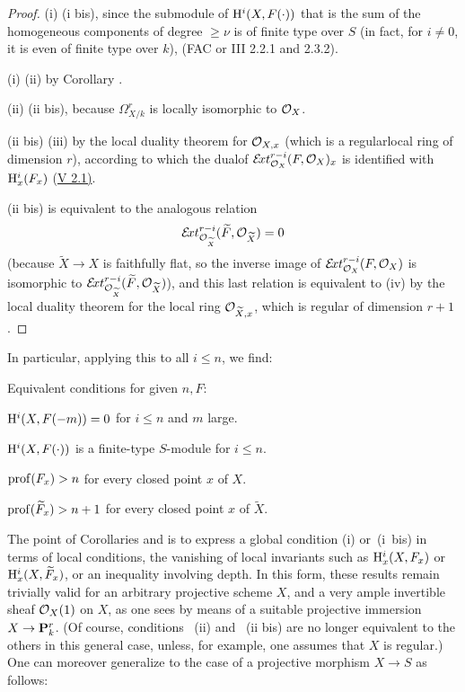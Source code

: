 \begin{proof}
(i) \SSI (i bis), since the submodule of $\mathrm H^i(X, F(\cdot))$ that is the sum of the homogeneous components of degree $\geq \nu$ is of finite type over $S$ (in fact, for $i\neq 0$, it is even of finite type over $k$), (\cf FAC or \EGA III 2.2.1 and 2.3.2).

(i) \SSI (ii) by Corollary .

(ii) \SSI (ii bis), because $\Omega_{X/k}^r$ is locally isomorphic to $\mathcal O_X$.

(ii bis) \SSI (iii) by the local duality theorem for $\mathcal O_{X,x}$ (which is a regular\pageoriginale local ring of dimension $r$), according to which the \og dual\fg of $\mathcal E\!xt^{r-i}_{\mathcal O_X}(F, \mathcal O_X)_x$ is identified with $\mathrm H^i_x(F_x)$ (\hyperref[V.2.1]{V 2.1)}.

(ii bis) is equivalent to the analogous relation
\[
\mathcal E\!xt^{r-i}_{\mathcal O_{\widetilde{X}}}(\widetilde{F}, \mathcal O_{\widetilde{X}})=0
\]
(because $\widetilde{X}\to X$ is faithfully flat, so the inverse image of $\mathcal E\!xt^{r-i}_{\mathcal O_X}(F, \mathcal O_X)$ is isomorphic to $\mathcal E\!xt^{r-i}_{\mathcal O_{\widetilde{X}}}(\widetilde{F}, \mathcal O_{\widetilde{X}})$), and this last relation is equivalent to (iv) by the local duality theorem for the local ring $\mathcal O_{\widetilde{X},x}$, which is regular of dimension $r+1$.
\skipqed
\end{proof}

In particular, applying this to all $i\leq n$, we find:

\begin{corollaire} \label{XII.1.4}
Equivalent conditions for given $n,F$:
\begin{enumeratei}
\item
$\mathrm H^i(X, F(-m))=0$ for $i\leq n$ and $m$ large.
\item[\textup{(i bis)}] $\mathrm H^i(X, F(\cdot))$ is a finite-type $S$-module for $i\leq n$.
\item
$\operatorname{prof}(F_x)>n$ for every closed point $x$ of $X$.
\item
$\operatorname{prof}(\widetilde{F}_x)>n+1$ for every closed point $x$ of $\widetilde{X}$.
\end{enumeratei}
\end{corollaire}

The point of Corollaries  and  is to express a global condition (i) or~(i~bis) in terms of local conditions,  the vanishing of local invariants such as $\mathrm H_x^i(X, F_x)$ or $\mathrm H_x^i(X, \widetilde{F}_x)$, or an inequality involving depth. In this form, these results remain trivially valid for an arbitrary projective scheme $X$, and a very ample invertible sheaf $\mathcal O_X(1)$ on $X$, as one sees by means of a suitable projective immersion $X\to\mathbf P_k^r$. (Of course, conditions ~(ii) and ~(ii bis) are no longer equivalent to the others in this general case, unless, for example, one assumes that $X$ is regular.) One can moreover generalize to the case of a projective morphism $X\to S$ as follows:

